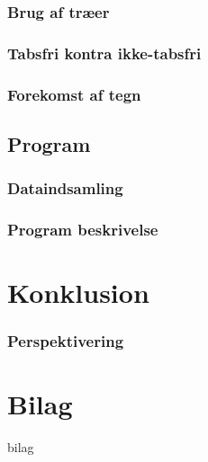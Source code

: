 \documentclass[12pt,a4paper]{report}
\begin{document}
	\subsection{Brug af træer}
	   
   
	\subsection{Tabsfri kontra ikke-tabsfri}
	

	\subsection{Forekomst af tegn}
	

   \section{Program}

	\subsection{Dataindsamling}
	
   
%   	
   	
   	\subsection{Program beskrivelse}
   	

\chapter{Konklusion}

           

           \subsection{Perspektivering}
	




\chapter*{Bilag}
 {bilag}
\end{document}
